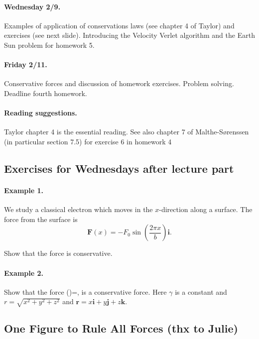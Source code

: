 \documentclass[%
oneside,                 %
final,                   %
10pt]{article}
\begin{document}
\paragraph{Wednesday 2/9.}
Examples of application of conservations laws (see chapter 4 of Taylor) and exercises (see next slide).
Introducing the Velocity Verlet algorithm and the Earth Sun problem for homework 5.

\paragraph{Friday 2/11.}
Conservative forces and discussion of homework exercises. Problem solving. Deadline fourth homework.


\paragraph{Reading suggestions.}
Taylor chapter 4 is the essential reading.
See also chapter 7 of Malthe-Sørenssen (in particular section 7.5) for exercise 6 in homework 4



\subsection{Exercises for Wednesdays after lecture part}


\paragraph{Example 1.}
We study a classical electron which moves in the $x$-direction along a surface. The force from the surface is
\[
\bm{F}(x)=-F_0\sin{(\frac{2\pi x}{b})}\bm{i}.
\]

Show that the force is conservative.




\paragraph{Example 2.}
Show that the force
()=\gamma {},
is a conservative force. Here $\gamma$ is a constant and $r=\sqrt{x^2+y^2+z^2}$ and $\bm{r}=x\bm{i}+y\bm{j}+z\bm{k}$.



\subsection{One Figure to Rule All Forces (thx to Julie)}
\end{document}
